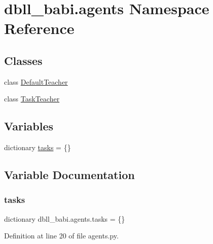 \hypertarget{namespacedbll__babi_1_1agents}{}\section{dbll\+\_\+babi.\+agents Namespace Reference}
\label{namespacedbll__babi_1_1agents}
\subsection*{Classes}
\begin{DoxyCompactItemize}
\item 
class \hyperlink{classdbll__babi_1_1agents_1_1DefaultTeacher}{Default\+Teacher}
\item 
class \hyperlink{classdbll__babi_1_1agents_1_1TaskTeacher}{Task\+Teacher}
\end{DoxyCompactItemize}
\subsection*{Variables}
\begin{DoxyCompactItemize}
\item 
dictionary \hyperlink{namespacedbll__babi_1_1agents_a42038d6e3d34e9710c4d4b6234354f2f}{tasks} = \{\}
\end{DoxyCompactItemize}


\subsection{Variable Documentation}
\mbox{\label{namespacedbll__babi_1_1agents_a42038d6e3d34e9710c4d4b6234354f2f}} 
\subsubsection{\texorpdfstring{tasks}{tasks}}
{\footnotesize\ttfamily dictionary dbll\+\_\+babi.\+agents.\+tasks = \{\}}



Definition at line 20 of file agents.\+py.

